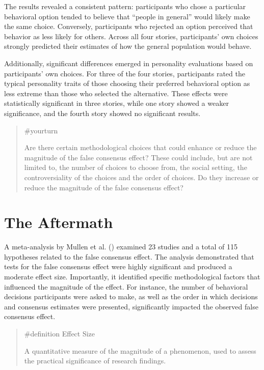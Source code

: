 \documentclass[
  letterpaper,
]{book}
\begin{document}
The results revealed a consistent pattern: participants who chose a
particular behavioral option tended to believe that ``people in
general'' would likely make the same choice. Conversely, participants
who rejected an option perceived that behavior as less likely for
others. Across all four stories, participants' own choices strongly
predicted their estimates of how the general population would behave.

Additionally, significant differences emerged in personality evaluations
based on participants' own choices. For three of the four stories,
participants rated the typical personality traits of those choosing
their preferred behavioral option as less extreme than those who
selected the alternative. These effects were statistically significant
in three stories, while one story showed a weaker significance, and the
fourth story showed no significant results.

\begin{quote}
{\#yourturn}

Are there certain methodological choices that could enhance or reduce
the magnitude of the false consensus effect? These could include, but
are not limited to, the number of choices to choose from, the social
setting, the controversiality of the choices and the order of choices.
Do they increase or reduce the magnitude of the false consensus effect?
\end{quote}

\section{The Aftermath}\label{the-aftermath-20}

A meta-analysis by Mullen et al.
() examined 23 studies and a total
of 115 hypotheses related to the false consensus effect. The analysis
demonstrated that tests for the false consensus effect were highly
significant and produced a moderate effect size. Importantly, it
identified specific methodological factors that influenced the magnitude
of the effect. For instance, the number of behavioral decisions
participants were asked to make, as well as the order in which decisions
and consensus estimates were presented, significantly impacted the
observed false consensus effect.

\begin{quote}
\label{def-effectsize}{\#definition} Effect Size

A quantitative measure of the magnitude of a phenomenon, used to assess
the practical significance of research findings.
\end{quote}
\end{document}
